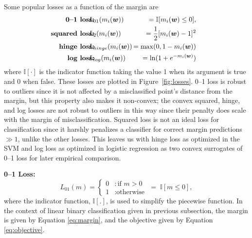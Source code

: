 Some popular losses as a function of the margin are
{\footnotesize
\begin{eqnarray}
\!\!\!\!\!\mbox{\bf 0--1 loss:} & \!\!\!\!\! L_{01}(m_i(\w))\!\!\!\!\! & = \mathbb{I} [m_i(\w) \leq 0], \label{eq:loss01} \\
\!\!\!\!\!\mbox{\bf squared loss:} & \!\!\!\!\! L_2(m_i(\w))\!\!\!\!\! &= \frac{1}{2}[m_i(\w) - 1]^2 \\
\!\!\!\!\!\mbox{\bf hinge loss:} & \!\!\!\!\! L_{hinge}(m_i(\w))\!\!\!\!\! &= \max(0, 1 - m_i(\w)) \\
\!\!\!\!\!\mbox{\bf log loss:} & \!\!\!\!\! L_{log}(m_i(\w))\!\!\!\!\! &= \ln (1 + e^{-m_i(\w)}) 
\end{eqnarray}}
where $\mathbb{I}[\cdot]$ is the indicator function taking the value 1
when its argument is true and 0 when false.  These losses are plotted
in Figure~\ref{fig:losses}.  0--1 loss is robust to outliers since it
is not affected by a misclassified point's distance from the margin,
but this property also makes it non-convex; the convex squared, hinge,
and log losses are not robust to outliers in this way since their
penalty does scale with the margin of misclassification.  Squared loss is
not an ideal loss for classification since it harshly penalizes a
classifier for correct margin predictions $\gg 1$, unlike the other
losses.  This leaves us with hinge loss as optimized in the SVM and
log loss as optimized in logistic regression as two convex surrogates
of 0--1 loss for later empirical comparison.


\MYCOMMENT

{\bf 0--1 Loss:} 
\begin{equation}
L_{01}(m) = \left\{
     \begin{array}{ll}
       0 & : \text{if }m > 0\\
       1 & : \text{otherwise}
     \end{array}
   \right.
   \; = \; \mathbb{I} [m \leq 0], \label{eq:loss01}
\end{equation}
where the indicator function, $\mathbb{I} [.]$, is used to simplify
the piecewise function. In the context of linear binary classification
given in previous subsection, the margin is given by Equation
\ref{eq:margin}, and the objective given by Equation
\ref{eq:objective}.

